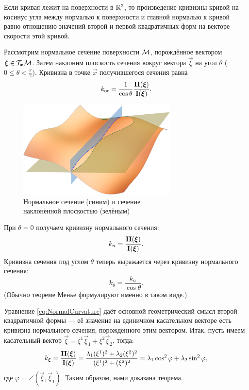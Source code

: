 
\begin{theorem}
	Если кривая лежит на поверхности в $\mathbb{R}^3$, то произведение кривизны кривой на косинус угла между нормалью к поверхности и главной нормалью к кривой равно отношению значений второй и первой квадратичных форм на векторе скорости этой кривой.
\end{theorem}

\begin{corollary}
	Рассмотрим нормальное сечение поверхности $\mathcal{M}$, порождённое вектором $\boldsymbol{\xi} \in \mathcal{T}_{\boldsymbol{x}}\mathcal{M}$. Затем наклоним плоскость сечения вокруг вектора $\vec{\xi}$ на угол $\theta$ ($0 \leqslant \theta < \frac{\pi}{2}$). Кривизна в точке $\vec{x}$ получившегося сечения равна
	\[
		k_{\mathrm{or}} = \frac{1}{\cos\theta}\frac{\boldsymbol{\operatorname{II}}(\boldsymbol{\xi})}{\boldsymbol{\operatorname{I}}(\boldsymbol{\xi})}.
	\]
\end{corollary}

\begin{figure}[H]
	\centering
	\includegraphics[width=8cm]{./img/ThetaSection.pdf}
	\caption{Нормальное сечение (синим) и сечение\\ наклонённой плоскостью (зелёным)}
\end{figure}

\noindent%
При $\theta = 0$ получаем кривизну нормального сечения:
\begin{equation} \label{eq:NormalCurvature}
	k_n = \frac{\boldsymbol{\operatorname{II}}(\boldsymbol{\xi})}{\boldsymbol{\operatorname{I}}(\boldsymbol{\xi})}.
\end{equation}
Кривизна сечения под углом $\theta$ теперь выражается через кривизну нормального сечения:
\[
	k_{\theta} = \frac{k_n}{\cos\theta}.
\]
(Обычно теореме Менье формулируют именно в таком виде.)

Уравнение \ref{eq:NormalCurvature} даёт основной геометрический смысл второй квадратичной формы --- её значение на единичном касательном векторе есть кривизна нормального сечения, порождённого этим вектором. Итак, пусть имеем касательный вектор $\vec{\xi} = \xi^1\vec{\xi}_1 + \xi^2\vec{\xi}_2$, тогда:
\[
	k_{\boldsymbol{\xi}} = \frac{\boldsymbol{\operatorname{II}}(\boldsymbol{\xi})}{\boldsymbol{\operatorname{I}}(\boldsymbol{\xi})} = \frac{\lambda_1(\xi^1)^2 + \lambda_2(\xi^2)^2}{(\xi^1)^2 + (\xi^2)^2} = \lambda_1\cos^2\varphi + \lambda_2\sin^2\varphi,
\]
где $\varphi = \angle(\vec{\xi}, \vec{\xi}_1)$. Таким образом, нами доказана теорема.

